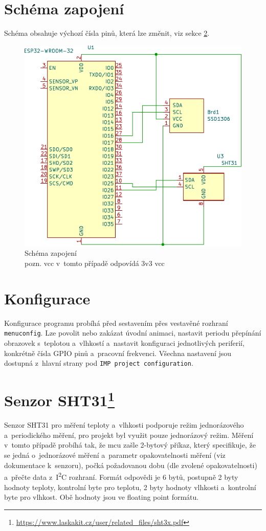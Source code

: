 \documentclass[a4paper, 12pt]{article}
\newcommand{\iic}{I\textsuperscript{2}C }
\begin{document}
\section{Schéma zapojení}
Schéma obsahuje výchozí čísla pinů, která lze změnit, viz sekce \ref{config}.
    \begin{figure}[H]
        \includegraphics{src/schematic.pdf}
        \caption{Schéma zapojení\\ pozn. vcc v~tomto případě odpovídá 3v3 vcc}
    \end{figure}

\section{Konfigurace}\label{config}
Konfigurace programu probíhá před sestavením přes vestavěné rozhraní \texttt{menuconfig}. Lze povolit nebo zakázat úvodní animaci, nastavit periodu přepínání obrazovek s~teplotou a~vlhkostí a~nastavit konfiguraci jednotlivých periferií, konkrétně čísla GPIO pinů a~pracovní frekvenci. Všechna nastavení jsou dostupná z~hlavní strany pod \texttt{IMP project configuration}.

\section[Senzor SHT31]{Senzor SHT31\protect\footnote{\url{https://www.laskakit.cz/user/related\_files/sht3x.pdf}}}
Senzor SHT31 pro měření teploty a~vlhkosti podporuje režim jednorázového a~periodického měření, pro projekt byl využit pouze jednorázový režim. Měření v~tomto případě probíhá tak, že mcu zašle 2-bytový příkaz, který specifikuje, že se jedná o~jednorázové měření a~parametr opakovatelnosti měření (viz dokumentace k~senzoru), počká požadovanou dobu (dle zvolené opakovatelnosti) a~přečte data z~\iic rozhraní. Formát odpovědi je 6 bytů, postupně 2 byty hodnoty teploty, kontrolní byte pro teplotu, 2 byty hodnoty vlhkosti a~kontrolní byte pro vlhkost. Obě hodnoty jsou ve floating point formátu.
\end{document}
